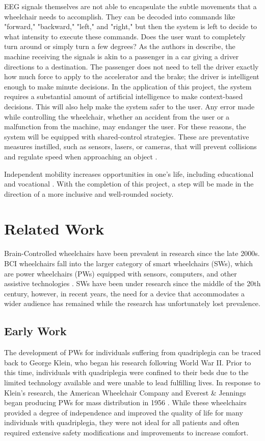 \documentclass[conference]{IEEEtran}
\begin{document}
    EEG signals themselves are not able to encapsulate the subtle movements that a wheelchair needs to accomplish. They can be decoded into commands like "forward," "backward," "left," and "right," but then the system is left to decide to what intensity to execute these commands. Does the user want to completely turn around or simply turn a few degrees? As the authors in \cite{learning_to_control} describe, the machine receiving the signals is akin to a passenger in a car giving a driver directions to a destination. The passenger does not need to tell the driver exactly how much force to apply to the accelerator and the brake; the driver is intelligent enough to make minute decisions. In the application of this project, the system requires a substantial amount of artificial intelligence to make context-based decisions. This will also help make the system safer to the user. Any error made while controlling the wheelchair, whether an accident from the user or a malfunction from the machine, may endanger the user. For these reasons, the system will be equipped with shared-control strategies. These are preventative measures instilled, such as sensors, lasers, or cameras, that will prevent collisions and regulate speed when approaching an object \cite{toward_brain_computer}. 
    
    Independent mobility increases opportunities in one's life, including educational and vocational \cite{how_many_people}. With the completion of this project, a step will be made in the direction of a more inclusive and well-rounded society.

\section{Related Work}
Brain-Controlled wheelchairs have been prevalent in research since the late 2000s. BCI wheelchairs fall into the larger category of smart wheelchairs (SWs), which are power wheelchairs (PWs) equipped with sensors, computers, and other assistive technologies \cite{a_comprehensive_review}. SWs have been under research since the middle of the 20th century, however, in recent years, the need for a device that accommodates a wider audience has remained while the research has unfortunately lost prevalence.  

    \subsection{Early Work}
    The development of PWs for individuals suffering from quadriplegia can be traced back to George Klein, who began his research following World War II. Prior to this time, individuals with quadriplegia were confined to their beds due to the limited technology available and were unable to lead fulfilling lives. In response to Klein's research, the American Wheelchair Company and Everest \& Jennings began producing PWs for mass distribution in 1956 \cite{a_comprehensive_review}. While these wheelchairs provided a degree of independence and improved the quality of life for many individuals with quadriplegia, they were not ideal for all patients and often required extensive safety modifications and improvements to increase comfort.
\end{document}
